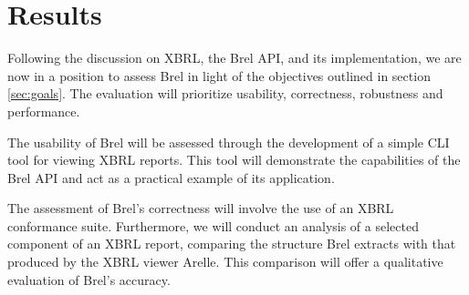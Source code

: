 \chapter{Results}
\label{chapter:results}






Following the discussion on XBRL, the Brel API, and its implementation, 
we are now in a position to assess Brel in light of the objectives outlined in section \ref{sec:goals}. 
The evaluation will prioritize usability, correctness, robustness and performance.

The usability of Brel will be assessed through the development of a simple CLI tool for viewing XBRL reports. 
This tool will demonstrate the capabilities of the Brel API and act as a practical example of its application.

The assessment of Brel's correctness will involve the use of an XBRL conformance suite. 
Furthermore, we will conduct an analysis of a selected component of an XBRL report, 
comparing the structure Brel extracts with that produced by the XBRL viewer Arelle. 
This comparison will offer a qualitative evaluation of Brel's accuracy.

